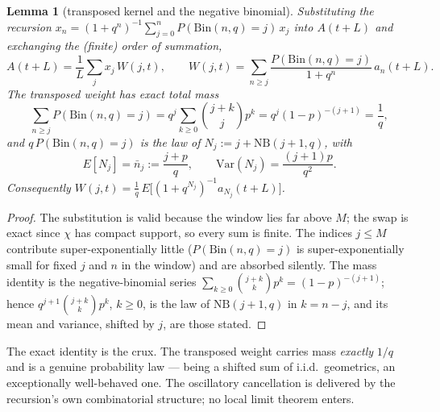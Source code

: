 \documentclass[11pt]{article}
\newtheorem{lemma}[theorem]{Lemma}
\theoremstyle{definition}
\begin{document}
\begin{lemma}[transposed kernel and the negative binomial]%
\label{lem:transposed}
  Substituting the recursion
  $x_n=(1+q^n)^{-1}\sum_{j=0}^{n}P(\mathrm{Bin}(n,q)=j)\,x_j$
  into $A(t+L)$ and exchanging the (finite) order of summation,
  \[
    A(t+L)=\frac1L\sum_{j}x_j\,W(j,t),\qquad
    W(j,t)=\sum_{n\ge j}\frac{P(\mathrm{Bin}(n,q)=j)}{1+q^n}\,
           a_n(t+L).
  \]
  The transposed weight has \emph{exact} total mass
  \[
    \sum_{n\ge j}P(\mathrm{Bin}(n,q)=j)
      =q^{j}\sum_{k\ge0}\binom{j+k}{j}p^{k}
      =q^{j}(1-p)^{-(j+1)}=\frac1q ,
  \]
  and $q\,P(\mathrm{Bin}(n,q)=j)$ is the law of
  $N_j:=j+\mathrm{NB}(j+1,q)$, with
  \[
    E[N_j]=\bar n_j:=\frac{j+p}{q},\qquad
    \mathrm{Var}(N_j)=\frac{(j+1)p}{q^{2}} .
  \]
  Consequently
  $W(j,t)=\tfrac1q\,E\bigl[(1+q^{N_j})^{-1}a_{N_j}(t+L)\bigr]$.
\end{lemma}

\begin{proof}
  The substitution is valid because the window lies far above $M$;
  the swap is exact since $\chi$ has compact support, so every sum is
  finite. The indices $j\le M$ contribute super-exponentially little
  ($P(\mathrm{Bin}(n,q)=j)$ is super-exponentially small for fixed $j$
  and $n$ in the window) and are absorbed silently. The mass identity
  is the negative-binomial series
  $\sum_{k\ge0}\binom{j+k}{k}p^{k}=(1-p)^{-(j+1)}$; hence
  $q^{j+1}\binom{j+k}{k}p^{k}$, $k\ge0$, is the law of
  $\mathrm{NB}(j+1,q)$ in $k=n-j$, and its mean and variance, shifted
  by $j$, are those stated.
\end{proof}

The exact identity is the crux. The transposed weight carries mass
\emph{exactly} $1/q$ and is a genuine probability law --- being a
shifted sum of i.i.d.\ geometrics, an exceptionally well-behaved one.
The oscillatory cancellation is delivered by the recursion's own
combinatorial structure; no local limit theorem enters.
\end{document}
